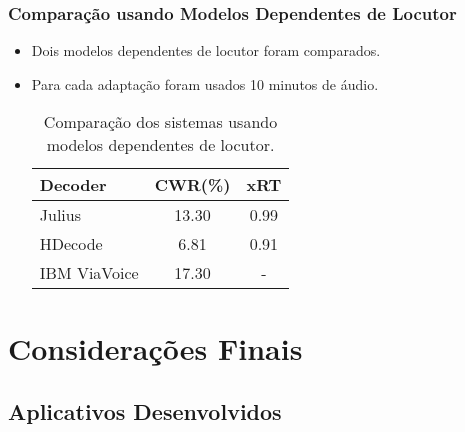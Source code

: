 \documentclass{beamer}
\begin{document}
\begin{frame}
   \frametitle{Comparação usando Modelos Dependentes de Locutor}
   \begin{itemize}
      \item Dois modelos dependentes de locutor foram comparados.
      \item Para cada adaptação foram usados 10 minutos de áudio.
      \begin{center}
      \begin{table}
	 \begin{tabular}{ l c c }
	    \toprule
	    \textbf{Decoder} & \textbf{CWR(\%)} & \textbf{xRT} \\\midrule
	    Julius & 13.30 & 0.99 \\\midrule
	    HDecode & 6.81 & 0.91 \\\midrule
	    IBM ViaVoice & 17.30 & - \\
	    \bottomrule
	 \end{tabular}
	 \caption{Comparação dos sistemas usando modelos dependentes de locutor.}
      \end{table}
      \end{center}
   \end{itemize}
\end{frame}


\section{Considerações Finais}
\subsection{Aplicativos Desenvolvidos}
\end{document}
